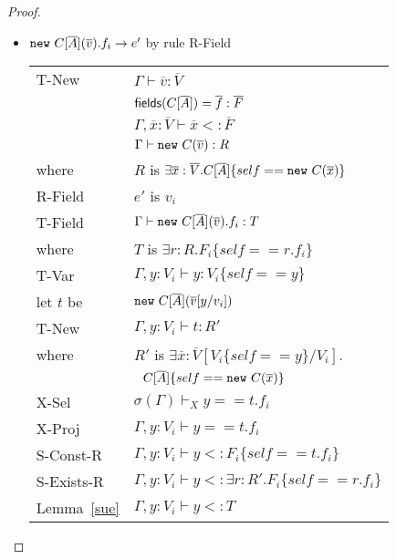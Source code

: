 \documentclass[preprint,nocopyrightspace,9pt]{sigplanconf}
\begin{document}
\begin{proof}
\begin{itemize}
\item ${\tt new}~C[\overline{A}](\overline{v}).f_i \rightarrow e'$ by rule {\sc R-Field}
\\
\begin{tabular}{ll}
{\sc T-New} & $\Gamma\vdash\overline{v}:\overline{V}$
\\
& ${\sf fields}(C[\overline{A}])=\overline{f}:\overline{F}$
\\
& $\Gamma,\overline{x}:\overline{V}\vdash \overline{x}<:\overline{F}$
\\
& $\Gamma\vdash{\tt new}~C(\overline{v}):R$
\\
where & $R$ is $\exists\overline{x}:\overline{V}.C[\overline{A}]\{self=={\tt new}~C(\overline{x})\}$
\\
{\sc R-Field} & $e'$ is $v_i$
\\
{\sc T-Field} &
$\Gamma\vdash{\tt new}~C[\overline{A}](\overline{v}).f_i:T$ \\
where & $T$ is $\exists r:R.F_i\{self==r.f_i\}$
\\
{\sc T-Var} & $\Gamma,y:V_i\vdash y:V_i\{self==y\}$
\\
let $t$ be & ${\tt new}~C[\overline{A}](\overline{v}[y/v_i])$
\\
{\sc T-New} & $\Gamma,y:V_i\vdash t:R'$
\\
where & $R'$ is $\exists\overline{x}:\overline{V}[V_i\{self==y\}/V_i].$\\
& $~~C[\overline{A}]\{self=={\tt new}~C(\overline{x})\}$
\\
{\sc X-Sel} & $\sigma(\Gamma)\vdash_X y==t.f_i$
\\
{\sc X-Proj} & $\Gamma,y:V_i\vdash y==t.f_i$
\\
{\sc S-Const-R} & $\Gamma,y:V_i\vdash y<:F_i\{self==t.f_i\}$
\\
{\sc S-Exists-R} & $\Gamma,y:V_i\vdash y<:\exists r:R'.F_i\{self==r.f_i\}$
\\
Lemma~\ref{sue} & $\Gamma,y:V_i\vdash y<:T$
\end{tabular}



\end{itemize}
\end{proof}
\end{document}

